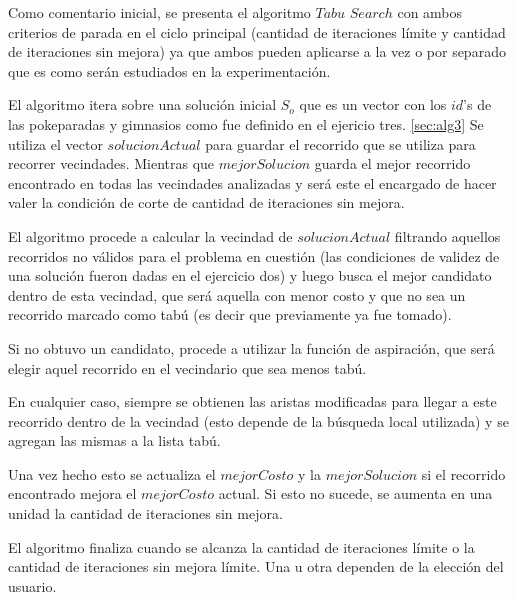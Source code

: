 Como comentario inicial, se presenta el algoritmo $Tabu$ $Search$ con ambos criterios de parada en el ciclo principal (cantidad de iteraciones límite y cantidad de iteraciones sin mejora) ya que ambos pueden aplicarse a la vez o por separado que es como serán estudiados en la experimentación.

El algoritmo itera sobre una solución inicial $S_o$ que es un vector con los $id$'s de las pokeparadas y gimnasios como fue definido en el ejericio tres. \ref{sec:alg3} 
Se utiliza el vector $solucionActual$ para guardar el recorrido que se utiliza para recorrer vecindades. Mientras que $mejorSolucion$ guarda el mejor recorrido encontrado en todas las vecindades analizadas y será este el encargado de hacer valer la condición de corte de cantidad de iteraciones sin mejora.

El algoritmo procede a calcular la vecindad de $solucionActual$ filtrando aquellos recorridos no válidos para el problema en cuestión (las condiciones de validez de una solución fueron dadas en el ejercicio dos) y luego busca el mejor candidato dentro de esta vecindad, que será aquella con menor costo y que no sea un recorrido marcado como tabú (es decir que previamente ya fue tomado).

Si no obtuvo un candidato, procede a utilizar la función de aspiración, que será elegir aquel recorrido en el vecindario que sea menos tabú.

En cualquier caso, siempre se obtienen las aristas modificadas para llegar a este recorrido dentro de la vecindad (esto depende de la búsqueda local utilizada) y se agregan las mismas a la lista tabú.

Una vez hecho esto se actualiza el $mejorCosto$ y la $mejorSolucion$ si el recorrido encontrado mejora el $mejorCosto$ actual. Si esto no sucede, se aumenta en una unidad la cantidad de iteraciones sin mejora. 

El algoritmo finaliza cuando se alcanza la cantidad de iteraciones límite o la cantidad de iteraciones sin mejora límite. Una u otra dependen de la elección del usuario.

\newpage

